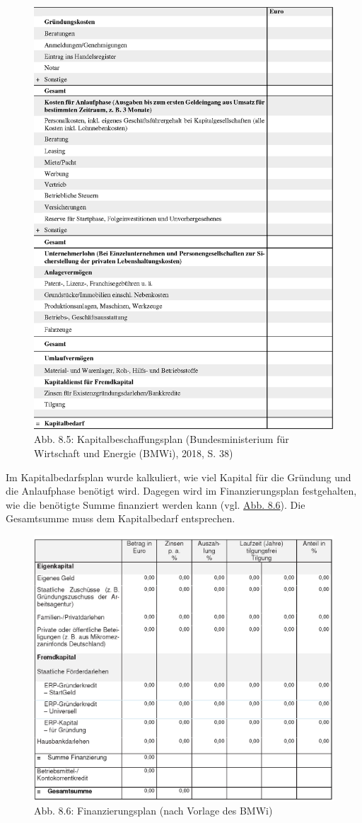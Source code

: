 \documentclass[
  letterpaper,
]{book}
\begin{document}
\begin{figure}

\includegraphics[width=0.75\linewidth,height=\textheight,keepaspectratio]{images/figure85.png} \hfill{}

\caption{Abb. 8.5: Kapitalbeschaffungsplan (Bundesministerium für
Wirtschaft und Energie (BMWi), 2018, S. 38)}

\end{figure}%

Im Kapitalbedarfsplan wurde kalkuliert, wie viel Kapital für die
Gründung und die Anlaufphase benötigt wird. Dagegen wird im
Finanzierungsplan festgehalten, wie die benötigte Summe finanziert
werden kann (vgl. \hyperref[figure86]{Abb. 8.6}). Die Gesamtsumme muss
dem Kapitalbedarf entsprechen.

\begin{figure}

\includegraphics[width=0.75\linewidth,height=\textheight,keepaspectratio]{images/figure86.png} \hfill{}

\caption{Abb. 8.6: Finanzierungsplan (nach Vorlage des BMWi)}

\end{figure}%
\end{document}
